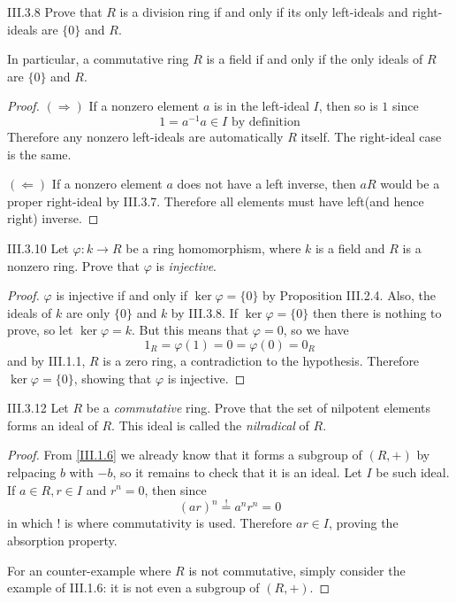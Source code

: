 \begin{problem}{III.3.8}
Prove that $R$ is a division ring if and only if its only left-ideals and right-ideals are $\{0\}$ and $R$.

In particular, a commutative ring $R$ is a field if and only if the only ideals of $R$ are $\{0\}$ and $R$.
\end{problem}
\begin{proof}

\noindent $(\Rightarrow)$ If a nonzero element $a$ is in the left-ideal $I$, then so is $1$ since
\[
1 = a^{-1}a \in I \text{ by definition}
\]
Therefore any nonzero left-ideals are automatically $R$ itself. The right-ideal case is the same.

\noindent $(\Leftarrow)$ If a nonzero element $a$ does not have a left inverse, then $aR$ would be a proper right-ideal by III.3.7. Therefore all elements must have left(and hence right) inverse.
\end{proof}

\begin{problem}{III.3.10}
Let $\varphi : k \to R$ be a ring homomorphism, where $k$ is a field and $R$ is a nonzero ring. Prove that $\varphi$ is \emph{injective}.
\end{problem}
\begin{proof}
$\varphi$ is injective if and only if $\ker \varphi = \{0\}$ by Proposition III.2.4. Also, the ideals of $k$ are only $\{0\}$ and $k$ by III.3.8. If $\ker \varphi = \{0\}$ then there is nothing to prove, so let $\ker \varphi = k$. But this means that $\varphi = 0$, so we have
\[
1_R = \varphi(1) = 0 = \varphi(0) = 0_R
\]
and by III.1.1, $R$ is a zero ring, a contradiction to the hypothesis. Therefore $\ker \varphi = \{0\}$, showing that $\varphi$ is injective.
\end{proof}


\begin{problem}{III.3.12}
Let $R$ be a \emph{commutative} ring. Prove that the set of nilpotent elements forms an ideal of $R$. This ideal is called the \emph{nilradical} of $R$.
\end{problem}
\begin{proof}
From \ref{III.1.6} we already know that it forms a subgroup of $(R,+)$ by relpacing $b$ with $-b$, so it remains to check that it is an ideal. Let $I$ be such ideal. If $a \in R, r \in I$ and $r^n = 0$, then since
\[
(ar)^n \overset{!}{=} a^nr^n = 0
\]
in which ! is where commutativity is used. Therefore $ar \in I$, proving the absorption property.

For an counter-example where $R$ is not commutative, simply consider the example of III.1.6: it is not even a subgroup of $(R, +)$.
\end{proof}

